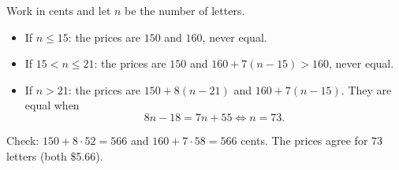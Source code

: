Work in cents and let $n$ be the number of letters.
\begin{itemize}
\item If $n\le15$: the prices are $150$ and $160$, never equal.
\item If $15<n\le21$: the prices are $150$ and $160+7(n-15)>160$, never equal.
\item If $n>21$: the prices are $150+8(n-21)$ and $160+7(n-15)$. They are equal when
\[
8n-18=7n+55\iff n=73 .
\]
\end{itemize}
Check: $150+8\cdot52=566$ and $160+7\cdot58=566$ cents. The prices agree for $\boxed{73}$ letters (both \$5.66).
